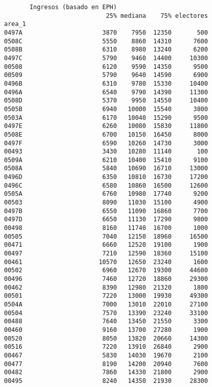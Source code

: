 \documentclass[11pt]{article}
\begin{document}
    \begin{verbatim}
       Ingresos (basado en EPH)                         
                            25% mediana    75% electores
area_1                                                  
0497A                      3870    7950  12350       500
0508C                      5550    8860  14310      7600
0508B                      6310    8980  13240      6200
0497C                      5790    9460  14400     10300
00508                      6120    9590  14350      9500
00509                      5790    9640  14590      6900
0496B                      6310    9780  15330     10400
0496A                      6540    9790  14390     11300
0508D                      5370    9950  14550     10400
0505B                      6940   10000  15540      3800
0503A                      6170   10040  15290      9500
0497E                      6260   10080  15830     11800
0508E                      6700   10150  16450      8000
0497F                      6590   10260  14730      3000
00493                      3430   10280  11140       100
0509A                      6210   10400  15410      9100
0508A                      5840   10690  16710     13000
0496D                      6350   10810  16730     17200
0496C                      6580   10860  16500     12600
0505A                      6760   10980  17740      9200
00503                      8090   11030  15100      4900
0497B                      6550   11090  16860      7700
0497D                      6650   11130  17290      9800
00498                      8160   11740  16700      1000
00505                      7040   12150  18960     16500
00471                      6660   12520  19100      1900
00497                      7210   12590  18360     15100
00461                     10570   12650  23240      1600
00502                      6960   12670  19300     44600
00496                      7460   12720  18860     29300
00462                      8390   12980  21320      1800
00501                      7220   13000  19930     49300
0504A                      7000   13010  22010     27100
00504                      7570   13390  23240     33100
00488                      7640   13450  21550      3300
00460                      9160   13700  27280      1900
00520                      8050   13820  20660     14300
00516                      7220   13910  26840      2900
00467                      5830   14030  19670      2100
00477                      8190   14200  20940      7600
00482                      7860   14330  21800      2900
00495                      8240   14350  21930     28300

\end{verbatim}
\end{document}
